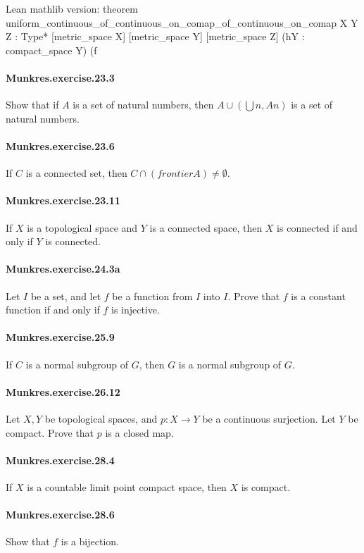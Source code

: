 \documentclass{article}
\begin{document}
Lean mathlib version:
theorem uniform_continuous_of_continuous_on_comap_of_continuous_on_comap {X Y Z : Type*} [metric_space X] [metric_space Y] [metric_space Z]
  (hY : compact_space Y) (f

\paragraph{Munkres.exercise.23.3} Show that if $A$ is a set of natural numbers, then $A ∪ (⋃ n, A n)$ is a set of natural numbers.

\paragraph{Munkres.exercise.23.6} If $C$ is a connected set, then $C ∩ (frontier A) ≠ ∅$.

\paragraph{Munkres.exercise.23.11} If $X$ is a topological space and $Y$ is a connected space, then $X$ is connected if and only if $Y$ is connected.

\paragraph{Munkres.exercise.24.3a} Let $I$ be a set, and let $f$ be a function from $I$ into $I$. Prove that $f$ is a constant function if and only if $f$ is injective.

\paragraph{Munkres.exercise.25.9} If $C$ is a normal subgroup of $G$, then $G$ is a normal subgroup of $G$.

\paragraph{Munkres.exercise.26.12} Let $X, Y$ be topological spaces, and $p : X → Y$ be a continuous surjection. Let $Y$ be compact. Prove that $p$ is a closed map.

\paragraph{Munkres.exercise.28.4} If $X$ is a countable limit point compact space, then $X$ is compact.

\paragraph{Munkres.exercise.28.6} Show that $f$ is a bijection.
\end{document}
